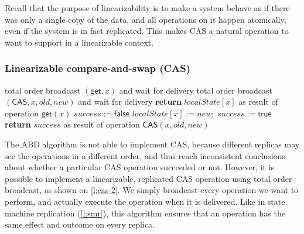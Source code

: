 Recall that the purpose of linearizability is to make a system behave as if there was only a single copy of the data, and all operations on it happen atomically, even if the system is in fact replicated.
This makes CAS a natural operation to want to support in a linearizable context.

\begin{frame}
    \label{s:cas-2}
    \frametitle{Linearizable compare-and-swap (CAS)}
    \footnotesize
    \begin{algorithmic}
            \State total order broadcast $(\mathsf{get}, x)$ and wait for delivery
        \EndOn
        \State
            \State total order broadcast $(\mathsf{CAS}, x, \mathit{old}, \mathit{new})$ and wait for delivery
        \EndOn
        \State
            \State \textbf{return} $\mathit{localState}[x]$ as result of operation $\mathsf{get}(x)$
        \EndOn
        \State
            \State $\mathit{success} := \mathsf{false}$
                \State $\mathit{localState}[x] := \mathit{new};\; \mathit{success} := \mathsf{true}$
            \EndIf
            \State \textbf{return} $\mathit{success}$ as result of operation $\mathsf{CAS}(x, \mathit{old}, \mathit{new})$
        \EndOn
    \end{algorithmic}
\end{frame}
\label{l:cas-2}

The ABD algorithm is not able to implement CAS, because different replicas may see the operations in a different order, and thus reach inconsistent conclusions about whether a particular CAS operation succeeded or not.
However, it is possible to implement a linearizable, replicated CAS operation using total order broadcast, as shown on \autoref{l:cas-2}.
We simply broadcast every operation we want to perform, and actually execute the operation when it is delivered.
Like in state machine replication (\autoref{l:smr}), this algorithm ensures that an operation has the same effect and outcome on every replica.

